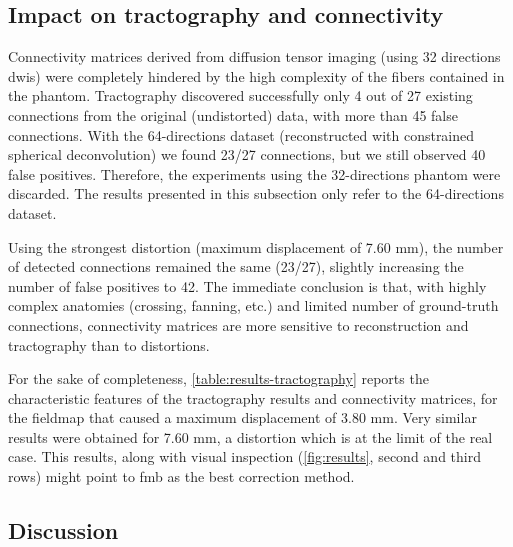 

\subsection{Impact on tractography and connectivity}

Connectivity matrices derived from diffusion tensor imaging 
(using 32 directions \glspl*{dwi}) were completely
hindered by the high complexity of the fibers contained
in the phantom. Tractography discovered successfully only 4 out 
of 27 existing connections from the original (undistorted) data,
with more than 45 false connections.
With the 64-directions dataset (reconstructed with constrained 
spherical deconvolution) we found 23/27 connections,
but we still observed 40 false positives. Therefore, the 
experiments using the 32-directions phantom were discarded. The
results presented in this subsection only refer to the 
64-directions dataset.

Using the strongest distortion (maximum displacement of 7.60 mm),
the number of detected connections
remained the same (23/27), slightly increasing the number of
false positives to 42. The immediate conclusion is that, with highly
complex anatomies (crossing, fanning, etc.) and limited number of
ground-truth connections, connectivity matrices are more sensitive 
to reconstruction and tractography than to distortions.

For the sake of completeness, \autoref{table:results-tractography}
reports the characteristic features of the tractography results
and connectivity matrices, for the fieldmap that caused a maximum
displacement of 3.80 mm. Very similar results were obtained for
7.60 mm, a distortion which is at the limit of the real case. This
results, along with visual inspection (\autoref{fig:results}, second
and third rows) might point to \gls*{fmb} as the best correction method.


\subsection{Discussion}

